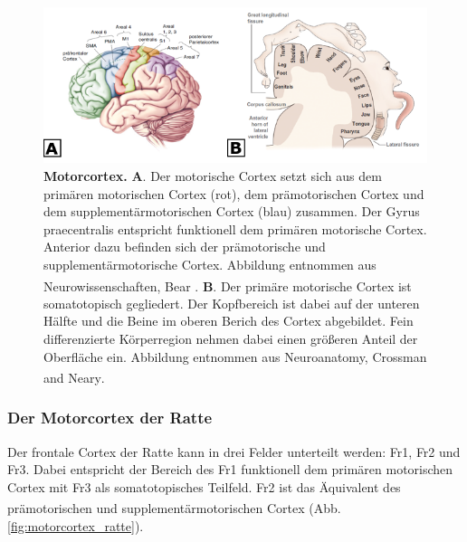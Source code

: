 \documentclass[12pt,a4paper,pdftex]{article}
\begin{document}
\begin{figure}[H]
    \centering
    \includegraphics[width=\textwidth]{pictures/Bilder_Laura/Motorcortex_2.png}
    \caption[Motorcortex]{\textbf{Motorcortex.} \textbf{A}. Der motorische Cortex setzt sich aus dem primären motorischen Cortex (rot), dem prämotorischen Cortex und dem supplementärmotorischen Cortex (blau) zusammen. Der Gyrus praecentralis entspricht funktionell dem primären motorische Cortex. Anterior dazu befinden sich der prämotorische und supplementärmotorische Cortex. Abbildung entnommen aus Neurowissenschaften, Bear \textsuperscript{\cite[14]{neurowissenschaften_baer}}. \textbf{B}. Der primäre motorische Cortex ist somatotopisch gegliedert. Der Kopfbereich ist dabei auf der unteren Hälfte und die Beine im oberen Berich des Cortex abgebildet. Fein differenzierte Körperregion nehmen dabei einen größeren Anteil der Oberfläche ein. Abbildung entnommen aus Neuroanatomy, Crossman and Neary\textsuperscript{\cite[8]{crossman2014neuroanatomy}}.}
    \label{fig:motorkortex}
\end{figure}

\subsubsection*{Der Motorcortex der Ratte}
Der frontale Cortex der Ratte kann in drei Felder unterteilt werden: Fr1, Fr2 und Fr3. 
Dabei entspricht der Bereich des Fr1 funktionell dem primären motorischen Cortex mit Fr3 als somatotopisches Teilfeld. Fr2 ist das Äquivalent des prämotorischen und supplementärmotorischen Cortex \textsuperscript{\cite[22]{paxinos2014rat}}(Abb. \ref{fig:motorcortex_ratte}).  
\end{document}
